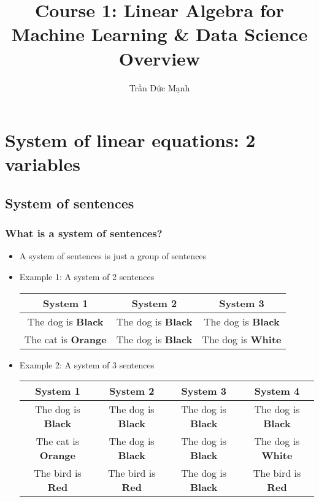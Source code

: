 \documentclass[12pt,a4paper]{article}
\author{Trần Đức Mạnh}
\title{Course 1: Linear Algebra for Machine Learning \& Data Science\\Overview}
\begin{document}
\maketitle
\tableofcontents
\newpage

\section{System of linear equations: 2 variables}
\subsection{System of sentences}
\subsubsection{What is a system of sentences?}
\begin{itemize}
    \item A system of sentences is just a group of sentences
    \item Example 1: A system of 2 sentences\\
    \begin{tabular}{c|c|c}
        System 1 & System 2 & System 3 \\
        \hline
        The dog is \textbf{Black} & The dog is \textbf{Black} & The dog is \textbf{Black} \\
        The cat is \textbf{Orange} & The dog is \textbf{Black} & The dog is \textbf{White}
    \end{tabular}
    \item Example 2: A system of 3 sentences\\
    \begin{tabular}{c|c|c|c}
        System 1 & System 2 & System 3 & System 4 \\
        \hline
        The dog is \textbf{Black} & The dog is \textbf{Black} & The dog is \textbf{Black} & The dog is \textbf{Black} \\
        The cat is \textbf{Orange} & The dog is \textbf{Black} & The dog is \textbf{Black} & The dog is \textbf{White} \\
        The bird is \textbf{Red} & The bird is \textbf{Red} & The dog is \textbf{Black} & The bird is \textbf{Red} \\
    \end{tabular}
\end{itemize}
\end{document}
